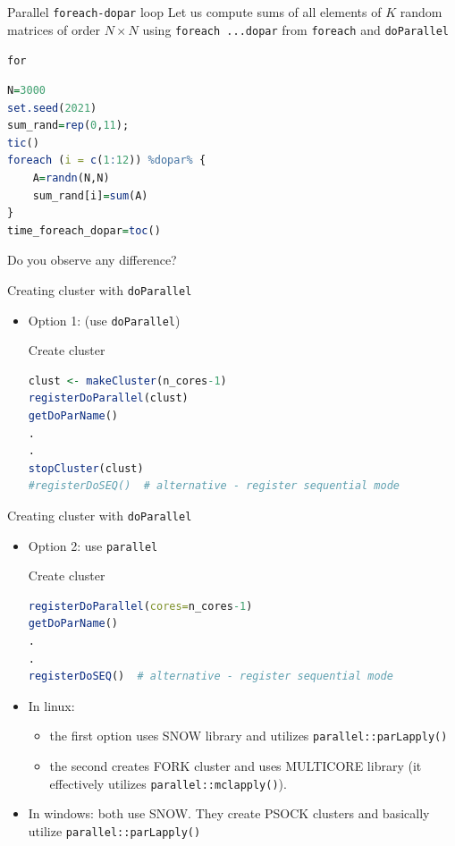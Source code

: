 \documentclass[compress,xcolor=table]{beamer}
\newcommand{\pp}{\pause}
\begin{document}
\begin{frame}[fragile]{ Parallel {\tt foreach-dopar} loop}
Let us compute sums of all elements of $K$ random matrices of order  $N\times N$ using {\tt foreach ...dopar} from {\tt foreach} and {\tt doParallel}
\begin{block}{{\tt for}}\scriptsize
	\begin{lstlisting}[basicstyle=\color{blue}\tiny\ttfamily,language=R,escapeinside=`']
N=3000
set.seed(2021)
sum_rand=rep(0,11);
tic()
foreach (i = c(1:12)) %dopar% {
	A=randn(N,N)
	sum_rand[i]=sum(A)
}
time_foreach_dopar=toc()
	\end{lstlisting}
\end{block}
\pp
Do you observe any difference?
\end{frame}



\begin{frame}[fragile]{Creating cluster with {\tt doParallel}}
	\begin{itemize}
		\item Option 1: (use {\tt doParallel})
\begin{block}{Create cluster}\scriptsize
	\begin{lstlisting}[basicstyle=\color{blue}\tiny\ttfamily,language=R,escapeinside=`']
clust <- makeCluster(n_cores-1)  
registerDoParallel(clust)  
getDoParName()
.
.
stopCluster(clust)
#registerDoSEQ()  # alternative - register sequential mode
	\end{lstlisting}
\end{block}
\end{itemize}
\end{frame}



\begin{frame}[fragile]{Creating cluster with {\tt doParallel}}
	\begin{itemize}
		\item Option 2: use {\tt parallel}		
		\begin{block}{Create cluster}\scriptsize
			\begin{lstlisting}[basicstyle=\color{blue}\tiny\ttfamily,language=R,escapeinside=`']
registerDoParallel(cores=n_cores-1)
getDoParName()
.
.
registerDoSEQ()  # alternative - register sequential mode
			\end{lstlisting}
		\end{block}
		\item In linux: 
		\begin{itemize}
			\item the first option uses SNOW library and utilizes {\tt parallel::parLapply()}
			\item the second creates FORK cluster and uses MULTICORE library (it effectively utilizes {\tt parallel::mclapply()}). 
		\end{itemize}
		\item In windows: both use SNOW. They create PSOCK clusters and basically utilize {\tt parallel::parLapply()}
		
	\end{itemize}
\end{frame}
\end{document}
